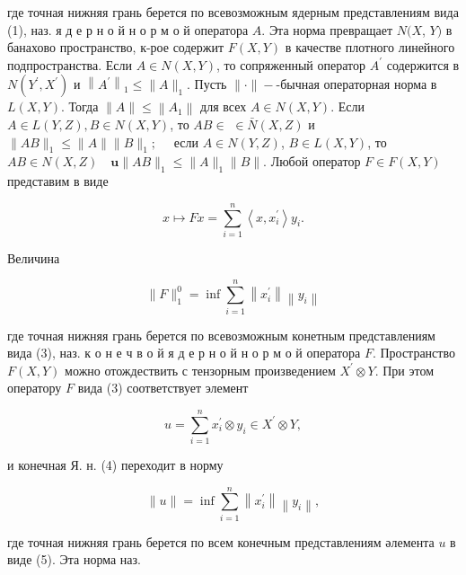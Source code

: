 \documentclass[10pt]{article}
\begin{document}
где точная нижняя грань берется по всевозможным ядерным представлениям вида (1), наз. я д е р н о й н о р м о й оператора $A$. Эта норма превращает $N(X$, $Y)$ в банахово пространство, к-рое содержит $F(X, Y)$ в качестве плотного линейного подпространства. Если $A \in N(X, Y)$, то сопряженный оператор $A^{\prime}$ содержится в $N\left(Y^{\prime}, X^{\prime}\right)$ и $\left\|A^{\prime}\right\|_{1} \leqslant\|A\|_{1}$. Пусть $\|\cdot\|-$-бычная операторная норма в $L(X, Y)$. Тогда $\|A\| \leqslant\left\|A_{1}\right\|$ для всех $A \in N(X, Y)$. Если $A \in L(Y, Z), B \in N(X, Y)$, то $A B \in$ $\in \bar{N}(X, Z)$ и $\|A B\|_{1} \leqslant\|A\|\|B\|_{1} ; \quad$ если $A \in N(Y, Z)$, $B \in L(X, Y)$, то $A B \in N(X, Z) \quad \mathbf{u}\|A B\|_{1} \leqslant\|A\|_{1}\|B\|$. Любой оператор $F \in F(X, Y)$ представим в виде



\[

x \mapsto F x=\sum_{i=1}^{n}\left\langle x, x_{i}^{\prime}\right\rangle y_{i} .

\]



Величина



\[

\|F\|_{1}^{0}=\inf \sum_{i=1}^{n}\left\|x_{i}^{\prime}\right\|\left\|y_{i}\right\|

\]



где точная нижняя грань берется по всевозможным конетным представлениям вида (3), наз. к о н е ч в о й я д е р н о й н о р м о й оператора $F$. Пространство $F(X, Y)$ можно отождествить с тензорным произведением $X^{\prime} \otimes Y$. При этом оператору $F$ вида (3) соответствует элемент



\[

u=\sum_{i=1}^{n} x_{i}^{\prime} \otimes y_{i} \in X^{\prime} \otimes Y,

\]



и конечная Я. н. (4) переходит в норму



\[

\|u\|=\inf \sum_{i=1}^{n}\left\|x_{i}^{\prime}\right\|\left\|y_{i}\right\|,

\]



где точная нижняя грань берется по всем конечным представлениям әлемента $u$ в виде (5). Эта норма наз.
\end{document}
